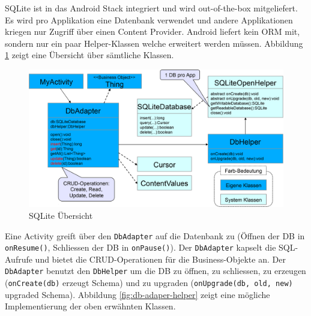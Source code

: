 SQLite ist in das Android Stack integriert und wird out-of-the-box mitgeliefert. Es wird pro Applikation eine Datenbank verwendet und andere Applikationen kriegen nur Zugriff über einen Content Provider. Android liefert kein ORM mit, sondern nur ein paar Helper-Klassen welche erweitert werden müssen. Abbildung \ref{fig:sqlite-uebersicht} zeigt eine Übersicht über sämtliche Klassen.
\begin{figure}
\centering
\includegraphics[width=\linewidth]{fig/sqlite-uebersicht}
\caption{SQLite Übersicht}
\label{fig:sqlite-uebersicht}
\end{figure}
Eine Activity greift über den \texttt{DbAdapter} auf die Datenbank zu (Öffnen der DB in \texttt{onResume()}, Schliessen der DB in \texttt{onPause()}). Der \texttt{DbAdapter} kapselt die SQL-Aufrufe und bietet die CRUD-Operationen für die Business-Objekte an. Der \texttt{DbAdapter} benutzt den \texttt{DbHelper} um die DB zu öffnen, zu schliessen, zu erzeugen (\texttt{onCreate(db)} erzeugt Schema) und zu upgraden (\texttt{onUpgrade(db, old, new)} upgraded Schema). Abbildung \ref{fig:db-adaper-helper} zeigt eine mögliche Implementierung der oben erwähnten Klassen.
